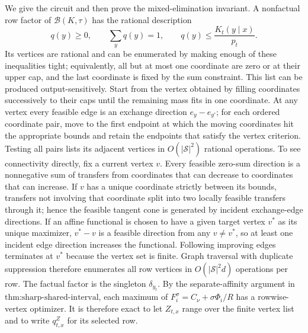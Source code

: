 We give the circuit and then prove the mixed-elimination invariant.  A nonfactual row factor of \(\mathcal B(K,\tau)\) has the rational description
\[
 q(y)\ge0,\qquad \sum_yq(y)=1,
 \qquad q(y)\le \frac{K_t(y\mid x)}{p_t}.
\]
Its vertices are rational and can be enumerated by making enough of these inequalities tight; equivalently, all but at most one coordinate are zero or at their upper cap, and the last coordinate is fixed by the sum constraint.  This list can be produced output-sensitively.  Start from the vertex obtained by filling coordinates successively to their caps until the remaining mass fits in one coordinate.  At any vertex every feasible edge is an exchange direction \(e_y-e_{y'}\); for each ordered coordinate pair, move to the first endpoint at which the moving coordinates hit the appropriate bounds and retain the endpoints that satisfy the vertex criterion.  Testing all pairs lists its adjacent vertices in \(O(|\mathcal S|^2)\) rational operations.  To see connectivity directly, fix a current vertex \(v\).  Every feasible zero-sum direction is a nonnegative sum of transfers from coordinates that can decrease to coordinates that can increase.  If \(v\) has a unique coordinate strictly between its bounds, transfers not involving that coordinate split into two locally feasible transfers through it; hence the feasible tangent cone is generated by incident exchange-edge directions.  If an affine functional is chosen to have a given target vertex \(v^*\) as its unique maximizer, \(v^*-v\) is a feasible direction from any \(v\ne v^*\), so at least one incident edge direction increases the functional.  Following improving edges terminates at \(v^*\) because the vertex set is finite.  Graph traversal with duplicate suppression therefore enumerates all row vertices in \(O(|\mathcal S|^2d)\) operations per row.  The factual factor is the singleton \(\delta_{y_t}\).  By the separate-affinity argument in \(\text{thm:sharp-shared-interval}\), each maximum of \(F_i^\sigma=C_\nu+\sigma\Phi_i/R\) has a rowwise-vertex optimizer.  It is therefore exact to let \(Z_{t,x}\) range over the finite vertex list and to write \(q^{Z}_{t,x}\) for its selected row.

